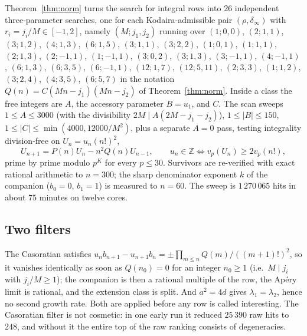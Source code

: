 \documentclass[11pt,reqno]{amsart}
\theoremstyle{plain}
\theoremstyle{definition}
\theoremstyle{remark}
\theoremstyle{plain}
\newcommand{\Z}{\mathbb{Z}}
\begin{document}
Theorem~\ref{thm:norm} turns the search for integral rows into $26$ independent
three-parameter searches, one for each Kodaira-admissible pair $(\rho,\delta_\infty)$ with $r_i=j_i/M\in[-1,2]$, namely
$(M;j_1,j_2)$ running over
$(1;0,0)$, $(2;1,1)$, $(3;1,2)$, $(4;1,3)$, $(6;1,5)$, $(3;1,1)$, $(3;2,2)$,
$(1;0,1)$, $(1;1,1)$, $(2;1,3)$, $(2;-1,1)$, $(1;-1,1)$, $(3;0,2)$, $(3;1,3)$,
$(3;-1,1)$, $(4;-1,1)$, $(6;1,3)$, $(6;3,5)$, $(6;-1,1)$, $(12;1,7)$,
$(12;5,11)$, $(2;3,3)$, $(1;1,2)$, $(3;2,4)$, $(4;3,5)$, $(6;5,7)$
in the notation $Q(n)=C(Mn-j_1)(Mn-j_2)$ of Theorem~\ref{thm:norm}. Inside a
class the free integers are $A$, the accessory parameter $B=u_1$, and $C$. The
scan sweeps $1\le A\le3000$ (with the divisibility $2M\mid A(2M-j_1-j_2)$),
$1\le|B|\le150$, $1\le|C|\le\min(4000,12000/M^2)$, plus a separate $A=0$ pass,
testing integrality division-free on $U_n=u_n(n!)^2$,
\[
U_{n+1}=P(n)U_n-n^2Q(n)U_{n-1},\qquad u_n\in\Z\iff v_p(U_n)\ge2v_p(n!),
\]
prime by prime modulo $p^K$ for every $p\le30$. Survivors are re-verified with
exact rational arithmetic to $n=300$; the sharp denominator exponent $k$ of the
companion ($b_0=0$, $b_1=1$) is measured to $n=60$. The sweep is
$1\,270\,065$ hits in about $75$ minutes on twelve cores.

\subsection{Two filters}
The Casoratian satisfies
$u_nb_{n+1}-u_{n+1}b_n=\pm\prod_{m\le n}Q(m)/((m+1)!)^2$, so it vanishes
identically as soon as $Q(n_0)=0$ for an integer $n_0\ge1$ (i.e.\ $M\mid j_i$
with $j_i/M\ge1$); the companion is then a rational multiple of the row, the
Ap\'ery limit is rational, and the extension class is split. And $a^2=4d$ gives
$\lambda_1=\lambda_2$, hence no second growth rate. Both are applied before any
row is called interesting. The Casoratian filter is not cosmetic: in one early
run it reduced $25\,390$ raw hits to $248$, and without it the entire top of the
raw ranking consists of degeneracies.
\end{document}
